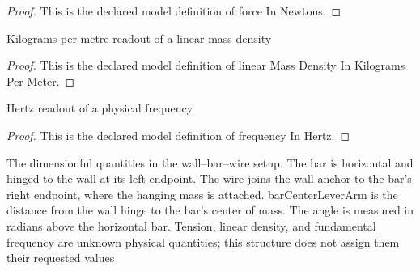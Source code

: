 \begin{proof}
  This is the declared model definition of force In Newtons.
\end{proof}
\begin{definition}
  \label{def:physics:phyx-mini-0181:phyxminiproblems-problemphyxmini0181-linearmassdensityinkilogramspermeter}
  Kilograms-per-metre readout of a linear mass density
\end{definition}
\begin{proof}
  This is the declared model definition of linear Mass Density In Kilograms Per Meter.
\end{proof}
\begin{definition}
  \label{def:physics:phyx-mini-0181:phyxminiproblems-problemphyxmini0181-frequencyinhertz}
  Hertz readout of a physical frequency
\end{definition}
\begin{proof}
  This is the declared model definition of frequency In Hertz.
\end{proof}
\begin{definition}
  \label{def:physics:phyx-mini-0181:phyxminiproblems-problemphyxmini0181-steelwirebarsetup}
  The dimensionful quantities in the wall--bar--wire setup. The bar is horizontal and hinged to the wall at its left endpoint. The wire joins the wall anchor to the bar's right endpoint, where the hanging mass is attached. barCenterLeverArm is the distance from the wall hinge to the bar's center of mass. The angle is measured in radians above the horizontal bar. Tension, linear density, and fundamental frequency are unknown physical quantities; this structure does not assign them their requested values
\end{definition}
